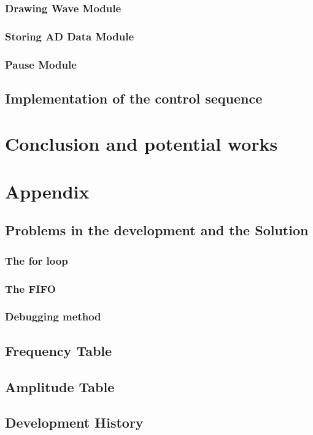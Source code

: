 \documentclass[11pt]{scrartcl}
\begin{document}
\subsubsection{Drawing Wave Module}
\subsubsection{Storing AD Data Module}
\subsubsection{Pause Module}
\subsection{Implementation of the control sequence}


\section{Conclusion and potential works}


\section{Appendix}
\subsection{Problems in the development and the Solution}
\subsubsection{The for loop}
\subsubsection{The FIFO}
\subsubsection{Debugging method}
\subsection{Frequency Table}
\subsection{Amplitude Table}
\subsection{Development History}





 
\end{document}
